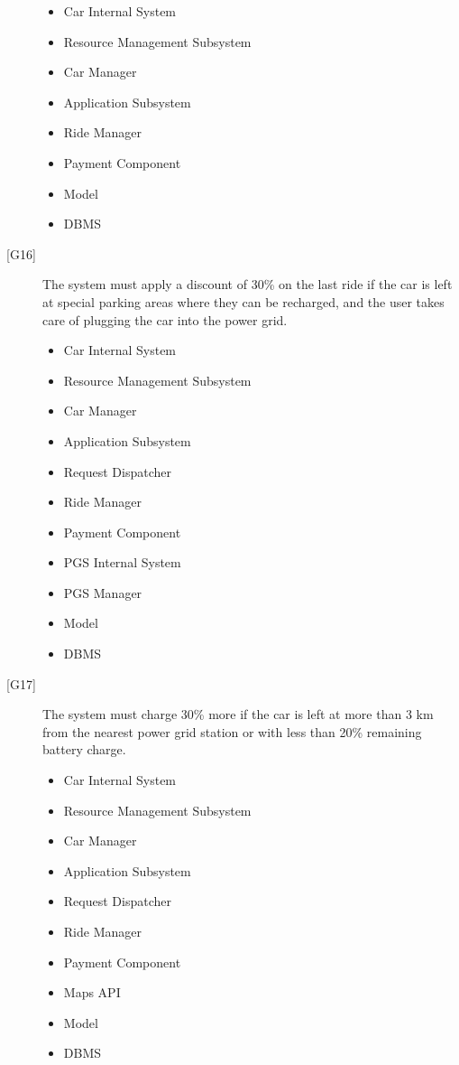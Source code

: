 \documentclass[english]{article}
\begin{document}
\begin{description}
	\begin{itemize}
		\item{Car Internal System}
		\item{Resource Management Subsystem}
		\item{Car Manager}
		\item{Application Subsystem}
		\item{Ride Manager}
		\item{Payment Component}
		\item{Model}
		\item{DBMS}
	\end{itemize}
	\item[{[G16]}]{The system must apply a discount of 30\% on the last ride if the car is left at special parking areas where they can be recharged, and the user takes care of plugging the car into the power grid.}
	\begin{itemize}
		\item{Car Internal System}
		\item{Resource Management Subsystem}
		\item{Car Manager}
		\item{Application Subsystem}
		\item{Request Dispatcher}
		\item{Ride Manager}
		\item{Payment Component}
		\item{PGS Internal System}
		\item{PGS Manager}
		\item{Model}
		\item{DBMS}
	\end{itemize}
	\item[{[G17]}]{The system must charge 30\% more if the car is left at more than 3 km from the nearest power grid station or with less than 20\% remaining battery charge.}
	\begin{itemize}
		\item{Car Internal System}
		\item{Resource Management Subsystem}
		\item{Car Manager}
		\item{Application Subsystem}
		\item{Request Dispatcher}
		\item{Ride Manager}
		\item{Payment Component}
		\item{Maps API}
		\item{Model}
		\item{DBMS}

\end{itemize}
\end{description}
\end{document}
